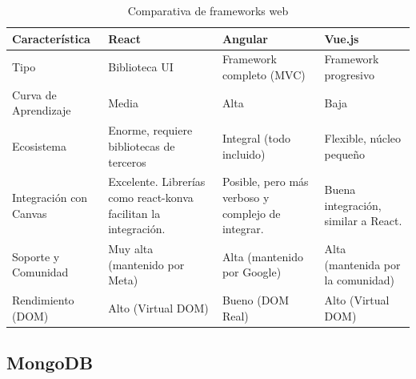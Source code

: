 ﻿\documentclass{iccmemoria}
\begin{document}
 
\begin{table}[H]
    \centering
    
    \caption{Comparativa de frameworks web}
    \label{tab:comparativa_frameworks} %
    
    \begin{tabular}{|p{3.4cm}|p{3.3cm}|p{3.3cm}|p{3.3cm}|} 
        \hline %
        
        \textbf{Característica} & \textbf{React} & \textbf{Angular} & \textbf{Vue.js} \\
        \hline %
        
        Tipo & Biblioteca UI & Framework completo (MVC) & Framework progresivo \\
        \hline
        Curva de Aprendizaje & Media & Alta & Baja \\
        \hline
        Ecosistema & Enorme, requiere bibliotecas de terceros & Integral (todo incluido) & Flexible, núcleo pequeño \\
        \hline
        Integración con Canvas & Excelente. Librerías como react-konva facilitan la integración. & Posible, pero más verboso y complejo de integrar. & Buena integración, similar a React. \\
        \hline
        Soporte y Comunidad & Muy alta (mantenido por Meta) & Alta (mantenido por Google) & Alta (mantenida por la comunidad) \\
        \hline
        Rendimiento (DOM) & Alto (Virtual DOM) & Bueno (DOM Real) & Alto (Virtual DOM) \\
        
        \hline %
    \end{tabular}
\end{table}
    
    \subsection{MongoDB}
\end{document}
